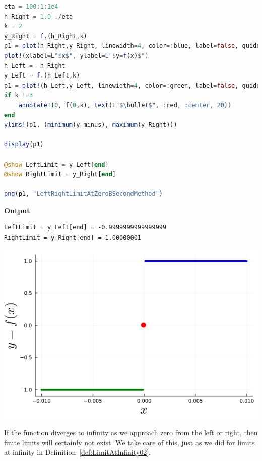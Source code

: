 \begin{center}
\setlength{\fboxrule}{2pt}  %
\end{center}


\begin{lstlisting}[language=Julia,style=mystyle]
eta = 100:1:1e4
h_Right = 1.0 ./eta
k = 2
y_Right = f.(h_Right,k)
p1 = plot(h_Right,y_Right, linewidth=4, color=:blue, label=false, guidefont=20)
plot!(xlabel=L"$x$", ylabel=L"$y=f(x)$")
h_Left = -h_Right
y_Left = f.(h_Left,k)
p1 = plot!(h_Left,y_Left, linewidth=4, color=:green, label=false, guidefont=20)
if k !=3
    annotate!(0, f(0,k), text(L"$\bullet$", :red, :center, 20))
end
ylims!(p1, (minimum(y_minus), maximum(y_Right)))

display(p1)

@show LeftLimit = y_Left[end]
@show RightLimit = y_Right[end]

png(p1, "LeftRightLimitAtZeroBSecondMethod")
\end{lstlisting}
\textbf{Output} 
\begin{verbatim}
LeftLimit = y_Left[end] = -0.9999999999999999
RightLimit = y_Right[end] = 1.00000001
\end{verbatim}

    \begin{center}
    \includegraphics[width=0.6\columnwidth]{graphics/Chap04/LeftRightLimitAtZeroBSecondMethod.png}
    \end{center}

\bigskip

If the function diverges to infinity as we approach zero from the left or right, then finite limits will certainly not exist. We take care of this, just as we did for limits at infinity in Definition~\ref{def:LimitAtInfinity02}.


